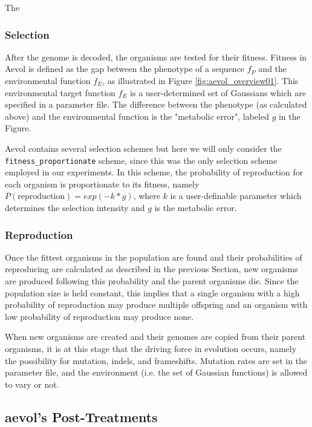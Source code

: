 The 

\subsubsection{Selection}
After the genome is decoded, the organisms are tested for their fitness. Fitness in Aevol is defined as the gap between the phenotype of a sequence $f_P$ and the environmental function $f_E$, as illustrated in Figure \ref{fig:aevol_overview01}. This environmental target function $f_E$ is a user-determined set of Gaussians which are specified in a parameter file. The difference between the phenotype (as calculated above) and the environmental function is the "metabolic error", labeled $g$ in the Figure. 

Aevol contains several selection schemes but here we will only consider the \texttt{fitness\_proportionate} scheme, since this was the only selection scheme employed in our experiments. In this scheme, the probability of reproduction for each organism is proportionate to its fitness, namely $P(\text{reproduction}) = exp(-k * g)$, where $k$ is a user-definable parameter which determines the selection intensity and $g$ is the metabolic error.
\subsubsection{Reproduction}
Once the fittest organisms in the population are found and their probabilities of reproducing are calculated as described in the previous Section, new organisms are produced following this probability and the parent organisms die. Since the population size is held constant, this implies that a single organism with a high probability of reproduction may produce multiple offspring and an organism with low probability of reproduction may produce none.

When new organisms are created and their genomes are copied from their parent organisms, it is at this stage that the driving force in evolution occurs, namely the possibility for mutation, indels, and frameshifts. Mutation rates are set in the parameter file, and the environment (i.e. the set of Gaussian functions) is allowed to vary or not. 
\subsection{aevol's Post-Treatments}\label{aevol_post-treatments}



